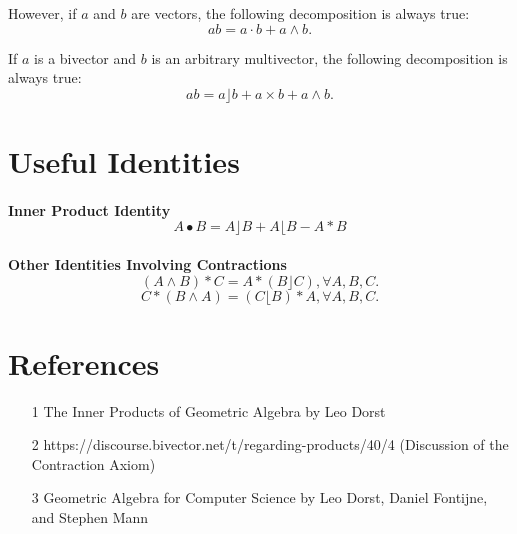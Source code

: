 \documentclass{article}
\begin{document}
However, if $a$ and $b$ are vectors, the following decomposition is always true:
$$ab = a \cdot b + a \wedge b.$$

If $a$ is a bivector and $b$ is an arbitrary multivector, the following decomposition is always true:
$$ab = a \rfloor b + a \times b + a \wedge b.$$


\section{Useful Identities}

\paragraph{}\textbf{Inner Product Identity} 
$$A\bullet B = A\rfloor B + A\lfloor B - A * B$$

\paragraph{}\textbf{Other Identities Involving Contractions}
$$(A \wedge B) * C = A * (B \rfloor C), \forall A,B,C.$$
$$C * (B \wedge A) = (C \lfloor B) * A, \forall A,B,C.$$


\section{References}

\begin{enumerate}
    \item [1] The Inner Products of Geometric Algebra by Leo Dorst
    \item [2] https://discourse.bivector.net/t/regarding-products/40/4 (Discussion of the Contraction Axiom)
    \item [3] Geometric Algebra for Computer Science by Leo Dorst, Daniel Fontijne, and Stephen Mann
    
\end{enumerate}
\end{document}
